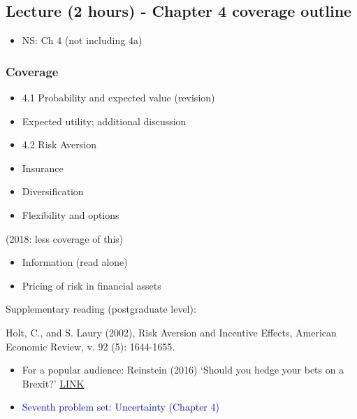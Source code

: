 \documentclass[]{article}
\providecommand{\tightlist}{%
  \setlength{\itemsep}{0pt}\setlength{\parskip}{0pt}}
\begin{document}
\hypertarget{lecture-2-hours---chapter-4-coverage-outline}{%
\subsection{Lecture (2 hours) - Chapter 4 coverage
outline}\label{lecture-2-hours---chapter-4-coverage-outline}}

\begin{itemize}
\tightlist
\item
  NS: Ch 4 (not including 4a)
\end{itemize}

\hypertarget{coverage}{%
\subsubsection{Coverage}\label{coverage}}

\begin{itemize}
\tightlist
\item
  4.1 Probability and expected value (revision)
\item
  Expected utility; additional discussion
\item
  4.2 Risk Aversion
\item
  Insurance
\item
  Diversification
\item
  Flexibility and options
\end{itemize}

(2018: less coverage of this)

\begin{itemize}
\tightlist
\item
  Information (read alone)
\item
  Pricing of risk in financial assets
\end{itemize}

Supplementary reading (postgraduate level):

Holt, C., and S. Laury (2002), Risk Aversion and Incentive Effects,
American Economic Review, v. 92 (5): 1644-1655.

\begin{itemize}
\item
  For a popular audience: Reinstein (2016) `Should you hedge your bets
  on a Brexit?'
  \href{https://davidreinstein.wordpress.com/2016/06/19/should-you-hedge-your-bets-on-a-brexit/}{LINK}
\item
  \textcolor{blue}{Seventh problem set: Uncertainty (Chapter 4)}
\end{itemize}
\end{document}

